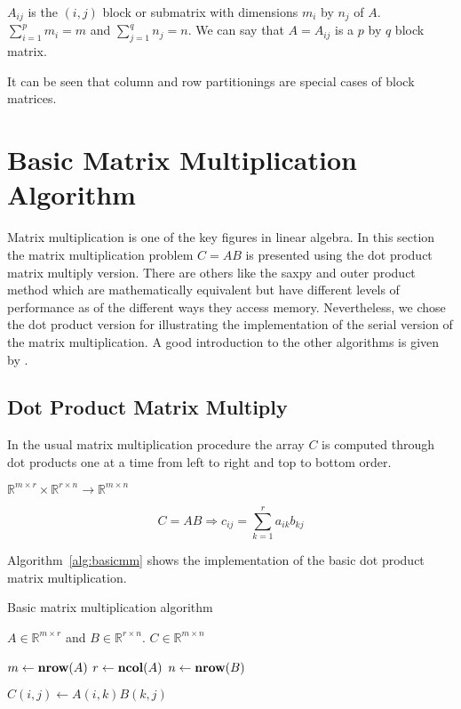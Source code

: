 $A_{ij}$ is the $(i,j)$ block or submatrix with dimensions $m_i$ by
$n_j$ of $A$. $\sum_{i=1}^p m_i = m$ and $\sum_{j=1}^q n_j = n$. 
We can say that $A = A_{ij}$ is a $p$ by $q$ block
matrix.   

It can be seen that column and row partitionings are special cases of
block matrices.

\section{Basic Matrix Multiplication Algorithm}

Matrix multiplication is one of the key figures in linear algebra. In
this section the matrix multiplication problem $C = AB$ is
presented using the dot product matrix multiply version. There are
others like the saxpy and outer product method which are
mathematically equivalent but have different levels of
performance as of the different ways they access memory. Nevertheless,
we chose the dot product version for illustrating the implementation
of the serial version of the matrix multiplication. A good
introduction to the other algorithms is given by \cite{golub96mc}. 

\subsection{Dot Product Matrix Multiply}
In the usual matrix multiplication procedure the array $C$ is computed
through dot products one at a time from left to right and top to
bottom order.
\newline

$\mathbb{R}^{m \times r} \times
\mathbb{R}^{r \times n} \to \mathbb{R}^{m \times n}$

$$ C = AB \Longrightarrow c_{ij} = \sum_{k=1}^r a_{ik}b_{kj} $$

Algorithm~\ref{alg:basicmm} shows the implementation of the basic dot
product matrix multiplication.

\begin{algorithm}
\caption{Basic matrix multiplication algorithm}
\label{alg:basicmm}
\begin{algorithmic}[1]

  \REQUIRE $A \in \mathbb{R}^{m \times r}$ and $B \in \mathbb{R}^{r
    \times n}$.
  \ENSURE $C \in \mathbb{R}^{m \times n}$

  \STATE $m \leftarrow \textbf{nrow} (A)$
  \STATE $r \leftarrow \textbf{ncol} (A)$
  \STATE $n \leftarrow \textbf{nrow} (B)$

         \STATE $C(i,j) \leftarrow A(i,k)B(k,j)$
       \ENDFOR
    \ENDFOR
  \ENDFOR

\end{algorithmic}
\end{algorithm}

